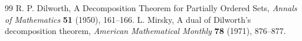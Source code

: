 \begin{thebibliography}{99}
 R. P.  Dilworth, A Decomposition Theorem for Partially Ordered Sets, {\em Annals of Mathematics} {\bf 51} (1950), 161--166.
 L. Mirsky, A dual of Dilworth's decomposition theorem, {\em American Mathematical Monthly} {\bf 78} (1971), 876--877.
\end{thebibliography}
